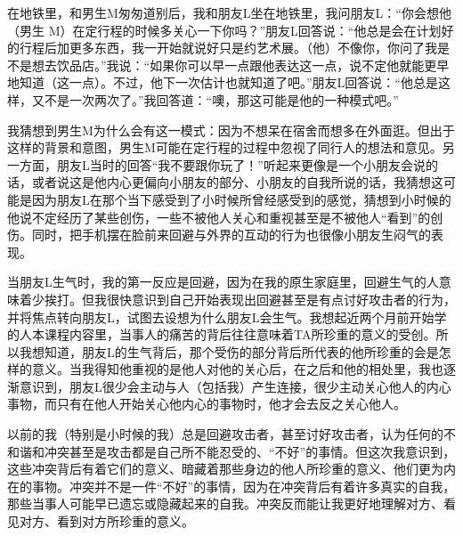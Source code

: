 在地铁里，和男生M匆匆道别后，我和朋友L坐在地铁里，我问朋友L：“你会想他（男生 M）在定行程的时候多关心一下你吗？”朋友L回答说：“他总是会在计划好的行程后加更多东西，我一开始就说好只是约艺术展。（他）不像你，你问了我是不是想去饮品店。”我说：“如果你可以早一点跟他表达这一点，说不定他就能更早地知道（这一点）。不过，他下一次估计也就知道了吧。”朋友L回答说：“他总是这样，又不是一次两次了。”我回答道：“噢，那这可能是他的一种模式吧。”

我猜想到男生M为什么会有这一模式：因为不想呆在宿舍而想多在外面逛。但出于这样的背景和意图，男生M可能在定行程的过程中忽视了同行人的想法和意见。另一方面，朋友L当时的回答“我不要跟你玩了！”听起来更像是一个小朋友会说的话，或者说这是他内心更偏向小朋友的部分、小朋友的自我所说的话，我猜想这可能是因为朋友L在那个当下感受到了小时候所曾经感受到的感觉，猜想到小时候的他说不定经历了某些创伤，一些不被他人关心和重视甚至是不被他人“看到”的创伤。同时，把手机摆在脸前来回避与外界的互动的行为也很像小朋友生闷气的表现。

当朋友L生气时，我的第一反应是回避，因为在我的原生家庭里，回避生气的人意味着少挨打。但我很快意识到自己开始表现出回避甚至是有点讨好攻击者的行为，并将焦点转向朋友L，试图去设想为什么朋友L会生气。我想起近两个月前开始学的人本课程内容里，当事人的痛苦的背后往往意味着TA所珍重的意义的受创。所以我想知道，朋友L的生气背后，那个受伤的部分背后所代表的他所珍重的会是怎样的意义。当我得知他重视的是他人对他的关心后，在之后和他的相处里，我也逐渐意识到，朋友L很少会主动与人（包括我）产生连接，很少主动关心他人的内心事物，而只有在他人开始关心他内心的事物时，他才会去反之关心他人。

\tristarsepline

以前的我（特别是小时候的我）总是回避攻击者，甚至讨好攻击者，认为任何的不和谐和冲突甚至是攻击都是自己所不能忍受的、“不好”的事情。但这次我意识到，这些冲突背后有着它们的意义、暗藏着那些身边的他人所珍重的意义、他们更为内在的事物。冲突并不是一件“不好”的事情，因为在冲突背后有着许多真实的自我，那些当事人可能早已遗忘或隐藏起来的自我。冲突反而能让我更好地理解对方、看见对方、看到对方所珍重的意义。






